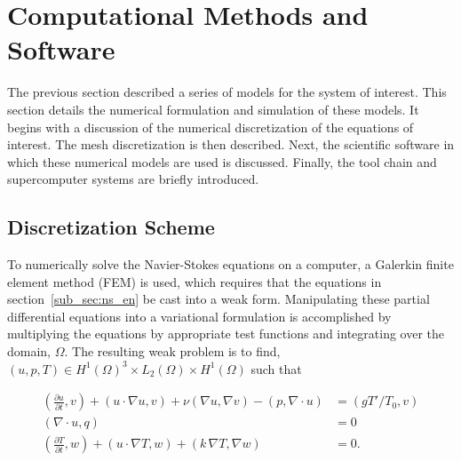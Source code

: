 \section{Computational Methods and Software}
\label{sec:software}

The previous section described a series of models 
for the system of interest. 
This section details the numerical formulation
and simulation of these models. It begins with a 
discussion of the numerical discretization of the equations 
of interest. The mesh discretization is then described. 
Next, the scientific software in which these numerical 
models are used is discussed. Finally, the tool
chain and supercomputer systems are briefly introduced. 

\subsection{Discretization Scheme}
To numerically solve the Navier-Stokes equations on a computer, a
Galerkin finite element method (FEM) is used, which
requires that the equations in section~\ref{sub_sec:ns_en} 
be cast into a weak form. Manipulating these partial differential
equations into a variational formulation is accomplished by multiplying 
the equations by appropriate test functions and integrating over the
domain, $\Omega$. The resulting weak problem is to find, 
$(u,p,T) \in H^1(\Omega)^3 \times L_2(\Omega) \times H^1(\Omega)$ such 
that 

%
%
\begin{align}
  (\frac{\partial u}{\partial t}, v) + (u \cdot \nabla u,v) + \nu
   (\nabla u, \nabla v)  
  -(p,\nabla \cdot u) &= (gT'/T_0,v)
 \label{eqn:ns_weak} \\
 (\nabla \cdot u,q) &= 0
 \label{eqn:cont_weak} \\
 (\frac{\partial T}{\partial t}, w) + (u \cdot \nabla T, w) + (k \, \nabla
 T, \nabla w) &= 0.\label{eqn:en_weak}
\end{align}

